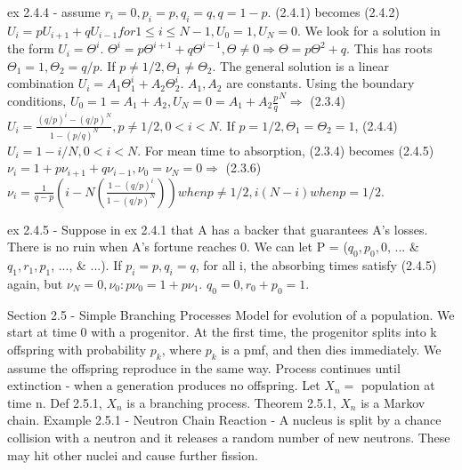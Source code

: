 \documentclass{article}
\begin{document}
ex 2.4.4 - assume $r_i = 0, p_i = p, q_i = q, q = 1-p$. (2.4.1) becomes (2.4.2) $U_i = p U_{i+1} + q U_{i-1} for 1 \le i \le N-1, U_0=1, U_N=0$. We look for a solution in the form $U_i = \Theta^i$. $\Theta^i = p \Theta^{i+1} + q \Theta^{i-1}, \Theta \ne 0 \Rightarrow \Theta = p \Theta^2 + q$. This has roots $\Theta_1 = 1, \Theta_2 = q/p$. If $p \ne 1/2, \Theta_1 \ne \Theta_2$. The general solution is a linear combination $U_i = A_1 \Theta_1^i + A_2 \Theta_2^i$. $A_1, A_2$ are constants. Using the boundary conditions, $U_0 = 1 = A_1 + A_2, U_N = 0 = A_1 + A_2 \frac{p}{q}^N \Rightarrow $ (2.3.4) $U_i = \frac{(q/p)^i - (q/p)^N}{1 - (p/q)^N}, p \ne 1/2, 0 < i < N$. If $p = 1/2, \Theta_1 = \Theta_2 = 1$, (2.4.4) $U_i = 1 - i/N, 0 < i < N$. For mean time to absorption, (2.3.4) becomes (2.4.5) $\nu_i = 1 + p \nu_{i+1} + q \nu_{i-1}, \nu_0 = \nu_N = 0 \Rightarrow$ (2.3.6) $\nu_i = \frac{1}{q-p} (i - N ( \frac {1 - (q/p)^i}{1 - (q/p)^N})) when p \ne 1/2, i(N-i) when p = 1/2$.

ex 2.4.5 - Suppose in ex 2.4.1 that A has a backer that guarantees A's losses. There is no ruin when A's fortune reaches 0. We can let P = ($q_0, p_0, 0$, ... \& $q_1, r_1, p_1$, ..., \& ...). If $p_i = p, q_i = q$, for all i, the absorbing times satisfy (2.4.5) again, but $\nu_N = 0, \nu_0: p \nu_0 = 1 + p \nu_1$. $q_0 = 0, r_0 + p_0 = 1$.

Section 2.5 - Simple Branching Processes
Model for evolution of a population. We start at time 0 with a progenitor. At the first time, the progenitor splits into k offspring with probability $p_k$, where {$p_k$} is a pmf, and then dies immediately. We assume the offspring reproduce in the same way. Process continues until extinction - when a generation produces no offspring. Let $X_n = $ population at time n.
Def 2.5.1, $X_n$ is a branching process.
Theorem 2.5.1, $X_n$ is a Markov chain.
Example 2.5.1 - Neutron Chain Reaction - A nucleus is split by a chance collision with a neutron and it releases a random number of new neutrons. These may hit other nuclei and cause further fission.
\end{document}
